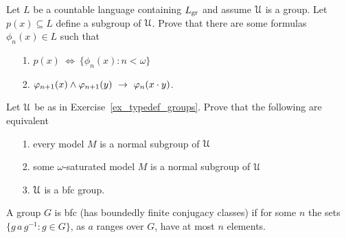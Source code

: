\begin{exercise}\label{ex_typedef_groups}
  Let $L$ be a countable language containing $L_{\rm gr}$ and assume $\EuScript U$ is a group.
  Let $p(x)\subseteq L$ define a subgroup of $\EuScript U$.
  Prove that there are some formulas $\phi_n(x)\in L$ such that 
  \begin{itemize}
    \item[1.] $p(x)\ \iff\ \{\phi_n(x):n<\omega\}$
    \item[2.] $\phi_{n+1}(x)\wedge\phi_{n+1}(y)\ \imp\ \phi_n(x\cdot y)$.
  \end{itemize}
\end{exercise}

\begin{exercise}\label{ex_bfc_groups}
  Let $\EuScript U$ be as in Exercise~\ref{ex_typedef_groups}.
  Prove that the following are equivalent
  \begin{itemize}
    \item[1.] every model $M$ is a normal subgroup of $\EuScript U$
    \item[2.] some $\omega$-saturated model $M$ is a normal subgroup of $\EuScript U$
    \item[3.] $\EuScript U$ is a {\sc bfc} group.
  \end{itemize}
  A group $G$ is {\sc bfc} (has boundedly finite conjugacy classes) if for some $n$ the sets $\{g\,a\,g^{-1}:g\in G\}$, as $a$ ranges over $G$, have at most $n$ elements. 
\end{exercise}